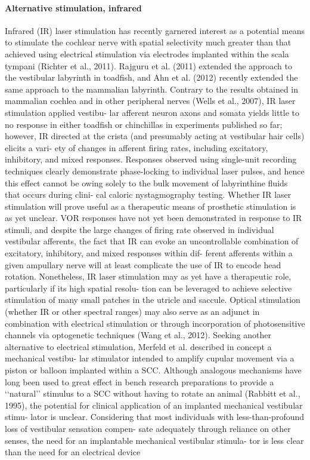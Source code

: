 \paragraph*{Alternative stimulation, infrared}
Infrared (IR) laser stimulation has recently garnered interest as a potential means to stimulate the cochlear nerve with spatial selectivity much greater than that achieved using electrical stimulation via electrodes implanted within the scala tympani (Richter et al., 2011). Rajguru et al. (2011) extended the approach to the vestibular labyrinth in toadfish, and Ahn et al. (2012) recently extended the same approach to the mammalian labyrinth. Contrary to the results obtained in mammalian cochlea and in other peripheral nerves (Wells et al., 2007), IR laser stimulation applied vestibu- lar afferent neuron axons and somata yields little to no response in either toadfish or chinchillas in experiments published so far; however, IR directed at the crista (and presumably acting at vestibular hair cells) elicits a vari- ety of changes in afferent firing rates, including excitatory, inhibitory, and mixed responses. Responses observed using single-unit recording techniques clearly demonstrate phase-locking to individual laser pulses, and hence this effect cannot be owing solely to the bulk movement of labyrinthine fluids that occurs during clini- cal caloric nystagmography testing.
Whether IR laser stimulation will prove useful as a therapeutic means of prosthetic stimulation is as yet unclear. VOR responses have not yet been demonstrated in response to IR stimuli, and despite the large changes of firing rate observed in individual vestibular afferents, the fact that IR can evoke an uncontrollable combination of excitatory, inhibitory, and mixed responses within dif- ferent afferents within a given ampullary nerve will at least complicate the use of IR to encode head rotation. Nonetheless, IR laser stimulation may as yet have a therapeutic role, particularly if its high spatial resolu- tion can be leveraged to achieve selective stimulation of many small patches in the utricle and saccule. Optical stimulation (whether IR or other spectral ranges) may also serve as an adjunct in combination with electrical stimulation or through incorporation of photosensitive channels via optogenetic techniques (Wang et al., 2012).
Seeking another alternative to electrical stimulation, Merfeld et al. described in concept a mechanical vestibu- lar stimulator intended to amplify cupular movement via a piston or balloon implanted within a SCC. Although analogous mechanisms have long been used to great effect in bench research preparations to provide a ‘‘natural’’ stimulus to a SCC without having to rotate an animal (Rabbitt et al., 1995), the potential for clinical application of an implanted mechanical vestibular stimu- lator is unclear. Considering that most individuals with less-than-profound loss of vestibular sensation compen- sate adequately through reliance on other senses, the need for an implantable mechanical vestibular stimula- tor is less clear than the need for an electrical device

